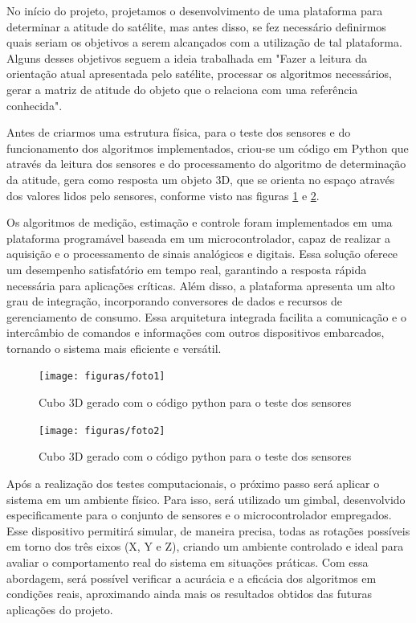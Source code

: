\documentclass[
	12pt,				%
	openright,			%
	oneside,			%
	a4paper,			%
	english,			%
	brazil				%
	]{abntex2}
\begin{document}
No início do projeto, projetamos o desenvolvimento de uma plataforma para determinar a atitude do satélite, mas antes disso, se fez necessário definirmos quais seriam os objetivos a serem alcançados com a utilização de tal plataforma. Alguns desses objetivos seguem a ideia trabalhada em \cite{tavares2017}"Fazer a leitura da orientação atual apresentada pelo satélite, processar os algoritmos necessários, gerar a matriz de atitude do objeto que o relaciona com uma referência conhecida".

Antes de criarmos uma estrutura física, para o teste dos sensores e do funcionamento dos algoritmos implementados, criou-se um código em Python que através da leitura dos sensores e do processamento do algoritmo de determinação da atitude, gera como resposta um objeto 3D, que se orienta no espaço através dos valores lidos pelo sensores, conforme visto nas figuras \ref{fig:Imagemcubo1} e \ref{fig:Imagemcubo2}.

Os algoritmos de medição, estimação e controle foram implementados em uma plataforma programável baseada em um microcontrolador, capaz de realizar a aquisição e o processamento de sinais analógicos e digitais. Essa solução oferece um desempenho satisfatório em tempo real, garantindo a resposta rápida necessária para aplicações críticas. Além disso, a plataforma apresenta um alto grau de integração, incorporando conversores de dados e recursos de gerenciamento de consumo. Essa arquitetura integrada facilita a comunicação e o intercâmbio de comandos e informações com outros dispositivos embarcados, tornando o sistema mais eficiente e versátil.

\begin{figure}[h]
	\centering
	\texttt{[image: figuras/foto1]}
	\caption{Cubo 3D gerado com o código python para o teste dos sensores}
	\label{fig:Imagemcubo1}
\end{figure}

\begin{figure}[h]
	\centering
	\texttt{[image: figuras/foto2]}
	\caption{Cubo 3D gerado com o código python para o teste dos sensores}
	\label{fig:Imagemcubo2}
\end{figure}


Após a realização dos testes computacionais, o próximo passo será aplicar o sistema em um ambiente físico. Para isso, será utilizado um gimbal, desenvolvido especificamente para o conjunto de sensores e o microcontrolador empregados. Esse dispositivo permitirá simular, de maneira precisa, todas as rotações possíveis em torno dos três eixos (X, Y e Z), criando um ambiente controlado e ideal para avaliar o comportamento real do sistema em situações práticas. Com essa abordagem, será possível verificar a acurácia e a eficácia dos algoritmos em condições reais, aproximando ainda mais os resultados obtidos das futuras aplicações do projeto.
\end{document}
